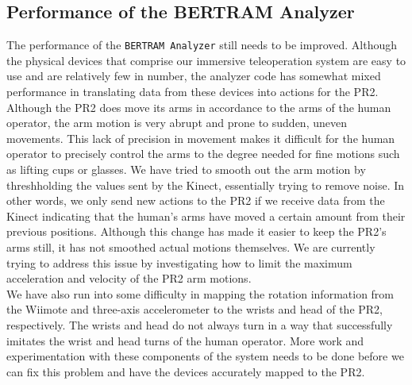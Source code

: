 \documentclass{sig-alternate}
\begin{document}
\subsection {Performance of the BERTRAM Analyzer}
\indent The performance of the {\tt BERTRAM Analyzer} still needs to be improved. Although the physical devices that comprise our immersive teleoperation system are easy to use and are relatively few in number, the analyzer code has somewhat mixed performance in translating data from these devices into actions for the PR2. Although the PR2 does move its arms in accordance to the arms of the human operator, the arm motion is very abrupt and prone to sudden, uneven movements. This lack of precision in movement makes it difficult for the human operator to precisely control the arms to the degree needed for fine motions such as lifting cups or glasses. We have tried to smooth out the arm motion by threshholding the values sent by the Kinect, essentially trying to remove noise. In other words, we only send new actions to the PR2 if we receive data from the Kinect indicating that the human's arms have moved a certain amount from their previous positions. Although this change has made it easier to keep the PR2's arms still, it has not smoothed actual motions themselves. We are currently trying to address this issue by investigating how to limit the maximum acceleration and velocity of the PR2 arm motions.\\
\indent We have also run into some difficulty in mapping the rotation information from the Wiimote and three-axis accelerometer to the wrists and head of the PR2, respectively. The wrists and head do not always turn in a way that successfully imitates the wrist and head turns of the human operator. More work and experimentation with these components of the system needs to be done before we can fix this problem and have the devices accurately mapped to the PR2.
\end{document}
